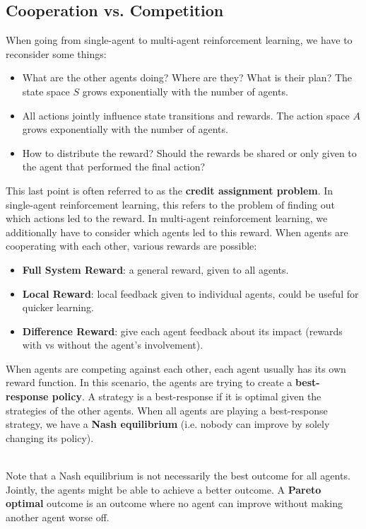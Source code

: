 \documentclass[12pt]{article}
\begin{document}
\subsection{Cooperation vs. Competition}
When going from single-agent to multi-agent reinforcement learning, we have to reconsider some things:

\begin{itemize}
    \item What are the other agents doing? Where are they? What is their plan? The state space $S$ grows exponentially with the number of agents.
    \item All actions jointly influence state transitions and rewards. The action space $A$ grows exponentially with the number of agents.
    \item How to distribute the reward? Should the rewards be shared or only given to the agent that performed the final action?
\end{itemize}

\noindent
This last point is often referred to as the \textbf{credit assignment problem}.
In single-agent reinforcement learning, this refers to the problem of finding out which actions led to the reward.
In multi-agent reinforcement learning, we additionally have to consider which agents led to this reward.
When agents are cooperating with each other, various rewards are possible:

\begin{itemize}
    \item \textbf{Full System Reward}: a general reward, given to all agents.
    \item \textbf{Local Reward}: local feedback given to individual agents, could be useful for quicker learning.
    \item \textbf{Difference Reward}: give each agent feedback about its impact (rewards with vs without the agent's involvement).
\end{itemize}

\noindent
When agents are competing against each other, each agent usually has its own reward function.
In this scenario, the agents are trying to create a \textbf{best-response policy}.
A strategy is a best-response if it is optimal given the strategies of the other agents.
When all agents are playing a best-response strategy, we have a \textbf{Nash equilibrium} (i.e. nobody can improve by solely changing its policy).

\noindent
\\
Note that a Nash equilibrium is not necessarily the best outcome for all agents.
Jointly, the agents might be able to achieve a better outcome.
A \textbf{Pareto optimal} outcome is an outcome where no agent can improve without making another agent worse off.
\end{document}
